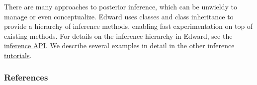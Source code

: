 There are many approaches to posterior inference, which can be unwieldy to
manage or even conceptualize. Edward uses classes and class
inheritance to provide a hierarchy of inference methods, enabling fast
experimentation on top of existing methods. For details on the inference
hierarchy in Edward, see the
\href{api/inferences}{inference API}. We describe several examples in
detail in the other inference \href{tutorials}{tutorials}.


\subsubsection{References}\label{references}

